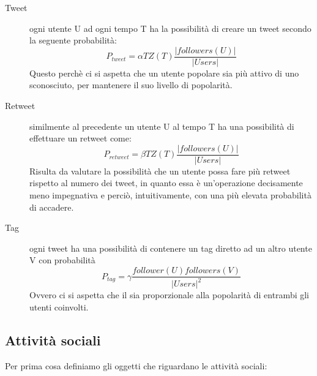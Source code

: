 \begin{description}
  \item[Tweet] ogni utente U ad ogni tempo T ha la possibilit\`a
  di creare un tweet secondo la seguente probabilit\`a:
    \begin{equation}
    \label{eq:ptwt}
      P_{tweet} = \alpha TZ(T) \dfrac{|followers(U)|}{|Users|}
    \end{equation}
  Questo perch\`e ci si aspetta che un utente popolare sia pi\`u 
  attivo di uno sconosciuto, per mantenere il suo livello di 
  popolarit\`a.
  
  \item[Retweet] similmente al precedente un utente U al tempo T
  ha una possibilit\`a di effettuare un retweet come:
    \begin{equation}
    \label{eq:pretwt}
        P_{retweet} = \beta TZ(T) \dfrac{|followers(U)|}{|Users|}
    \end{equation}
    Risulta da valutare la possibilit\`a che un utente possa fare 
    pi\`u  retweet rispetto al numero dei tweet, in quanto essa \`e
    un'operazione decisamente meno impegnativa e perci\`o,
    intuitivamente,
    con una pi\`u elevata probabilit\`a di accadere. 
    
  \item[Tag] ogni tweet ha una possibilit\`a di contenere un tag 
  diretto ad un altro utente V con probabilit\`a
  \begin{equation}
  \label{eq:ptag}
    P_{tag} = \gamma \dfrac{follower(U) followers(V)}{{|Users|^2}}
  \end{equation} 
  Ovvero ci si aspetta che il \dtag{} sia proporzionale alla 
  popolarit\`a di entrambi gli utenti coinvolti.
\end{description}

\subsection{Attivit\`a sociali}
\label{subsec:social}

Per prima cosa definiamo gli oggetti che riguardano le attivit\`a 
sociali:

